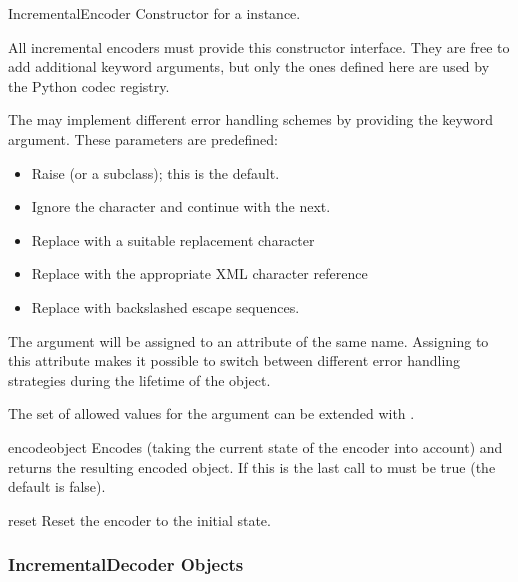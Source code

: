 \begin{classdesc}{IncrementalEncoder}{}
  Constructor for a  instance.

  All incremental encoders must provide this constructor interface. They are
  free to add additional keyword arguments, but only the ones defined
  here are used by the Python codec registry.

  The  may implement different error handling
  schemes by providing the  keyword argument. These
  parameters are predefined:

  \begin{itemize}
    \item {} Raise  (or a subclass);
                          this is the default.
    \item {} Ignore the character and continue with the next.
    \item {} Replace with a suitable replacement character
    \item {} Replace with the appropriate XML
                     character reference
    \item {} Replace with backslashed escape sequences.
  \end{itemize}

  The  argument will be assigned to an attribute of the
  same name. Assigning to this attribute makes it possible to switch
  between different error handling strategies during the lifetime
  of the  object.

  The set of allowed values for the  argument can
  be extended with .
\end{classdesc}

\begin{methoddesc}{encode}{object}
  Encodes  (taking the current state of the encoder into account)
  and returns the resulting encoded object. If this is the last call to
    must be true (the default is false).
\end{methoddesc}

\begin{methoddesc}{reset}{}
  Reset the encoder to the initial state.
\end{methoddesc}


\subsubsection{IncrementalDecoder Objects \label{incremental-decoder-objects}}

